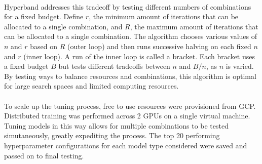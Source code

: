 \documentclass[11pt]{article}
\begin{document}
\begin{multicols*}{2}
            \vspace{-10pt}

            \paragraph{}
                Hyperband addresses this tradeoff by testing different numbers of combinations for a fixed budget. 
                Define $r$, the minimum amount of iterations that can be allocated to a single combination, and $R$, the maximum amount of iterations that can be allocated to a single combination. 
                The algorithm chooses various values of $n$ and $r$ based on $R$ (outer loop) and then runs successive halving on each fixed $n$ and $r$ (inner loop). 
                A run of the inner loop is called a bracket. 
                Each bracket uses a fixed budget $B$ but tests different tradeoffs between $n$ and $B/n$, as $n$ is varied.
                By testing ways to balance resources and combinations, this algorithm is optimal for large search spaces and limited computing resources. 
            
            \vspace{-10pt}

            \paragraph{}
                To scale up the tuning process, free to use resources were provisioned from GCP.
                Distributed training was performed across 2 GPUs on a single virtual machine. 
                Tuning models in this way allows for multiple combinations to be tested simutaneously, greatly expediting the process.
                The top 20 performing hyperparameter configurations for each model type considered were saved and passed on to final testing.   
            



            
                
                




                        




            


\end{multicols*}
\end{document}
